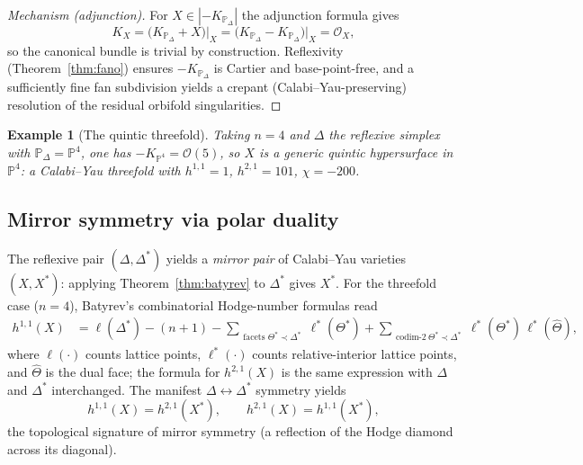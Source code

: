 \documentclass{amsart}
\newtheorem{example}[theorem]{Example}
\begin{document}
\begin{proof}[Mechanism (adjunction)]
For $X \in |-K_{\mathbb{P}_\Delta}|$ the adjunction formula gives
\begin{equation}
  K_X = \bigl(K_{\mathbb{P}_\Delta} + X\bigr)\big|_X
      = \bigl(K_{\mathbb{P}_\Delta} - K_{\mathbb{P}_\Delta}\bigr)\big|_X
      = \mathcal{O}_X,
\end{equation}
so the canonical bundle is trivial by construction. Reflexivity
(Theorem~\ref{thm:fano}) ensures $-K_{\mathbb{P}_\Delta}$ is Cartier and
base-point-free, and a sufficiently fine fan subdivision yields a crepant
(Calabi--Yau-preserving) resolution of the residual orbifold
singularities.
\end{proof}

\begin{example}[The quintic threefold]\label{ex:quintic}
Taking $n=4$ and $\Delta$ the reflexive simplex with
$\mathbb{P}_\Delta = \mathbb{P}^4$, one has
$-K_{\mathbb{P}^4} = \mathcal{O}(5)$, so $X$ is a generic quintic
hypersurface in $\mathbb{P}^4$: a Calabi--Yau threefold with
$h^{1,1}=1$, $h^{2,1}=101$, $\chi = -200$.
\end{example}

\subsection{Mirror symmetry via polar duality}

The reflexive pair $(\Delta,\Delta^*)$ yields a \emph{mirror pair} of
Calabi--Yau varieties $(X, X^*)$: applying Theorem~\ref{thm:batyrev} to
$\Delta^*$ gives $X^*$. For the threefold case ($n=4$), Batyrev's
combinatorial Hodge-number formulas read
\begin{align}
  h^{1,1}(X) &= \ell(\Delta^*) - (n+1)
     - \sum_{\substack{\text{facets }\Theta^* \prec \Delta^*}} \ell^*(\Theta^*)
     + \sum_{\substack{\text{codim-}2\ \Theta^* \prec \Delta^*}}
        \ell^*(\Theta^*)\,\ell^*(\widehat{\Theta}),
\end{align}
where $\ell(\cdot)$ counts lattice points, $\ell^*(\cdot)$ counts
relative-interior lattice points, and $\widehat{\Theta}$ is the dual face;
the formula for $h^{2,1}(X)$ is the same expression with $\Delta$ and
$\Delta^*$ interchanged. The manifest $\Delta \leftrightarrow \Delta^*$
symmetry yields
\begin{equation}
  h^{1,1}(X) = h^{2,1}(X^*), \qquad h^{2,1}(X) = h^{1,1}(X^*),
\end{equation}
the topological signature of mirror symmetry (a reflection of the Hodge
diamond across its diagonal).
\end{document}
